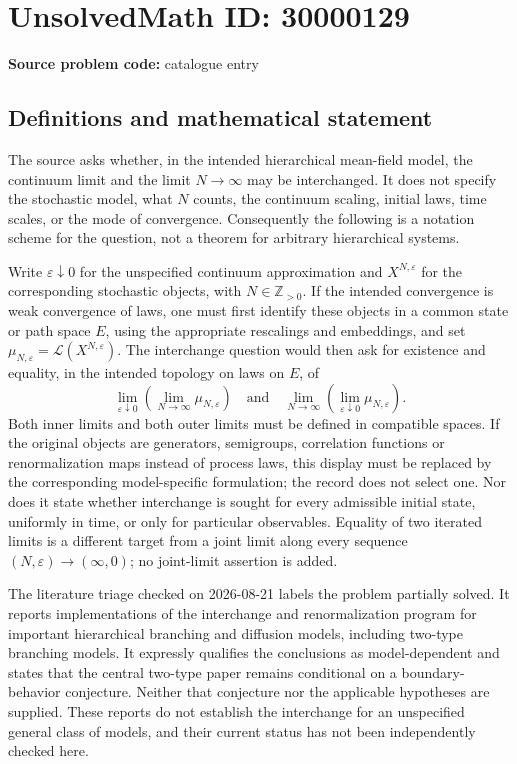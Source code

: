 \documentclass[11pt]{article}
\newcommand{\Z}{\mathbb{Z}}
\begin{document}
\section*{UnsolvedMath ID: 30000129}
\textbf{Source problem code:} catalogue entry
\subsection{Definitions and mathematical statement}
The source asks whether, in the intended hierarchical mean-field model, the continuum limit and the limit \(N\to\infty\) may be interchanged. It does not specify the stochastic model, what \(N\) counts, the continuum scaling, initial laws, time scales, or the mode of convergence. Consequently the following is a notation scheme for the question, not a theorem for arbitrary hierarchical systems.

Write \(\varepsilon\downarrow0\) for the unspecified continuum approximation and \(X^{N,\varepsilon}\) for the corresponding stochastic objects, with \(N\in\Z_{>0}\). If the intended convergence is weak convergence of laws, one must first identify these objects in a common state or path space \(E\), using the appropriate rescalings and embeddings, and set \(\mu_{N,\varepsilon}=\mathcal L(X^{N,\varepsilon})\). The interchange question would then ask for existence and equality, in the intended topology on laws on \(E\), of
\[
 \lim_{\varepsilon\downarrow0}\left(\lim_{N\to\infty}\mu_{N,\varepsilon}\right)
 \quad\text{and}\quad
 \lim_{N\to\infty}\left(\lim_{\varepsilon\downarrow0}\mu_{N,\varepsilon}\right).
\]
Both inner limits and both outer limits must be defined in compatible spaces. If the original objects are generators, semigroups, correlation functions or renormalization maps instead of process laws, this display must be replaced by the corresponding model-specific formulation; the record does not select one. Nor does it state whether interchange is sought for every admissible initial state, uniformly in time, or only for particular observables. Equality of two iterated limits is a different target from a joint limit along every sequence \((N,\varepsilon)\to(\infty,0)\); no joint-limit assertion is added.

The literature triage checked on 2026-08-21 labels the problem partially solved. It reports implementations of the interchange and renormalization program for important hierarchical branching and diffusion models, including two-type branching models. It expressly qualifies the conclusions as model-dependent and states that the central two-type paper remains conditional on a boundary-behavior conjecture. Neither that conjecture nor the applicable hypotheses are supplied. These reports do not establish the interchange for an unspecified general class of models, and their current status has not been independently checked here.
\end{document}
